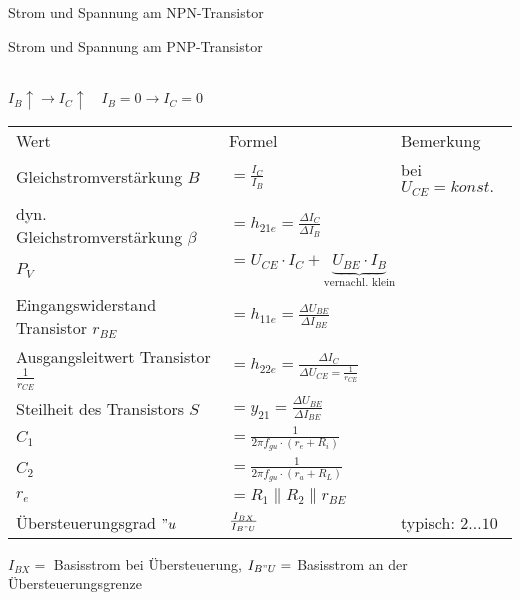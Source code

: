 
\begin{minipage}{0.5\columnwidth}
    Strom und Spannung am NPN-Transistor
\end{minipage}
\begin{minipage}{0.5\columnwidth}
    Strom und Spannung am PNP-Transistor    
\end{minipage}
\noindent\\
$I_B\uparrow\rightarrow I_C\uparrow\quad I_B=0\rightarrow I_C=0$
\renewcommand{\arraystretch}{1.0}
\begin{table}[H]
    \begin{tabularx}{\columnwidth}{l l l}
        Wert                                           & Formel                                                                   & Bemerkung \\
        Gleichstromverstärkung $B$                     & $=\frac{I_C}{I_B}$                                                       & bei $U_{CE}=konst.$ \\
        dyn. Gleichstromverstärkung $\beta$            & $=h_{21e}=\frac{\Delta I_C}{\Delta I_B}$                                 & \\
        $P_V$                                          & $=U_{CE}\cdot I_C + \underbrace{U_{BE}\cdot I_B}_\text{vernachl. klein}$ & \\
        Eingangswiderstand Transistor $r_{BE}$         & $=h_{11e}=\frac{\Delta U_{BE}}{\Delta I_{BE}}$                           & \\
        Ausgangsleitwert Transistor $\frac{1}{r_{CE}}$ & $=h_{22e}=\frac{\Delta I_C}{\Delta U_{CE}=\frac{1}{r_{CE}}}$             & \\
        Steilheit des Transistors $S$                  & $=y_{21}=\frac{\Delta U_{BE}}{\Delta I_{BE}}$                            & \\
        $C_1$                                          & $=\frac{1}{2\pi f_{gu}\cdot (r_e+R_i)}$                                  & \\
        $C_2$                                          & $=\frac{1}{2\pi f_{gu}\cdot (r_a+R_L)}$                                  & \\
        $r_e$                                          & $=R_1\parallel R_2\parallel r_{BE}$                                      & \\
        Übersteuerungsgrad $"u$                        & $\frac{I_{BX}}{I_{B"U}}$                                                 & typisch: $2\dots10$\\
    \end{tabularx}
\end{table}
$I_{BX}=$ Basisstrom bei Übersteuerung, $I_{B"U}=$ Basisstrom an der Übersteuerungsgrenze 
